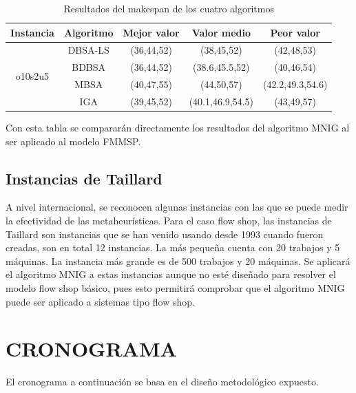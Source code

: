 \documentclass{article}
\begin{document}
\begin{table}[h]
    \caption{Resultados del makespan de los cuatro algoritmos}
    \label{tab:algs}
    \begin{center}
    \begin{tabular}{ccccc}
        \hline
        Instancia & Algoritmo & Mejor valor & Valor medio & Peor valor\\
        \hline
        \multirow{4}{*}{o10s2u5} & DBSA-LS & (36,44,52) & (38,45,52) & (42,48,53)\\
         & BDBSA & (36,44,52) & (38.6,45.5,52) & (40,46,54)\\
         & MBSA & (40,47,55) & (44,50,57) & (42.2,49.3,54.6)\\
         & IGA & (39,45,52) & (40.1,46.9,54.5) & (43,49,57)\\
        \hline
    \end{tabular}
    \end{center}
\end{table}

Con esta tabla se compararán directamente los resultados del algoritmo MNIG al ser aplicado al modelo FMMSP.

\subsection{Instancias de Taillard}

A nivel internacional, se reconocen algunas instancias con las que se puede medir la efectividad de las metaheurísticas. Para el caso flow shop, las instancias de Taillard son instancias que se han venido usando desde 1993 cuando fueron creadas, son en total 12 instancias. La más pequeña cuenta con 20 trabajos y 5 máquinas. La instancia más grande es de 500 trabajos y 20 máquinas. Se aplicará el algoritmo MNIG a estas instancias aunque no esté diseñado para resolver el modelo flow shop básico, pues esto permitirá comprobar que el algoritmo MNIG puede ser aplicado a sistemas tipo flow shop.

\section{CRONOGRAMA}

El cronograma a continuación se basa en el diseño metodológico expuesto.
\end{document}
